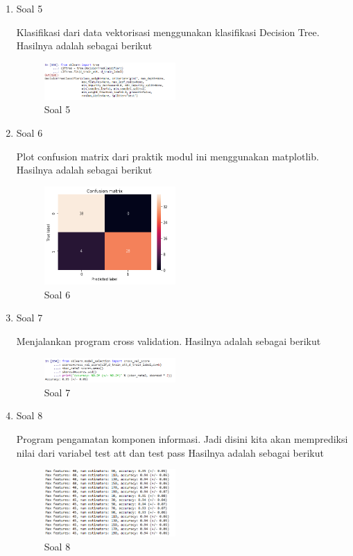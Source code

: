 \begin{enumerate}
	\item Soal 5
	\hfill\break
	
	Klasifikasi dari data vektorisasi menggunakan klasifikasi Decision Tree. Hasilnya adalah sebagai berikut 
	
	\begin{figure}[H]
	\centering
		\includegraphics[width=5cm]{figures/1174087/4/9.png}
		\caption{Soal 5}
	\end{figure}

	\item Soal 6
	\hfill\break
	
	Plot confusion matrix dari praktik modul ini menggunakan matplotlib. Hasilnya adalah sebagai berikut 
	\begin{figure}[H]
	\centering
		\includegraphics[width=5cm]{figures/1174087/4/10.png}
		\caption{Soal 6}
	\end{figure}

	\item Soal 7
	\hfill\break
	
	Menjalankan program cross validation. Hasilnya adalah sebagai berikut 
	\begin{figure}[H]
	\centering
		\includegraphics[width=5cm]{figures/1174087/4/11.png}
		\caption{Soal 7}
	\end{figure}

	\item Soal 8
	\hfill\break
	
	Program pengamatan komponen informasi. Jadi disini kita akan memprediksi nilai dari variabel test att dan test pass Hasilnya adalah sebagai berikut 
	\begin{figure}[H]
	\centering
		\includegraphics[width=5cm]{figures/1174087/4/12.png}
		\caption{Soal 8}
	\end{figure}
\end{enumerate}

